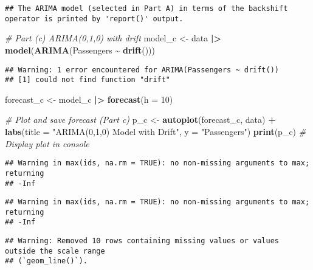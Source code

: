 \documentclass[
]{article}
\newenvironment{Shaded}{\begin{snugshade}}{\end{snugshade}}
\newcommand{\AttributeTok}[1]{\textcolor[rgb]{0.13,0.29,0.53}{#1}}
\newcommand{\CommentTok}[1]{\textcolor[rgb]{0.56,0.35,0.01}{\textit{#1}}}
\newcommand{\DecValTok}[1]{\textcolor[rgb]{0.00,0.00,0.81}{#1}}
\newcommand{\FunctionTok}[1]{\textcolor[rgb]{0.13,0.29,0.53}{\textbf{#1}}}
\newcommand{\NormalTok}[1]{#1}
\newcommand{\OtherTok}[1]{\textcolor[rgb]{0.56,0.35,0.01}{#1}}
\newcommand{\SpecialCharTok}[1]{\textcolor[rgb]{0.81,0.36,0.00}{\textbf{#1}}}
\newcommand{\StringTok}[1]{\textcolor[rgb]{0.31,0.60,0.02}{#1}}
\begin{document}
\begin{verbatim}
## The ARIMA model (selected in Part A) in terms of the backshift operator is printed by 'report()' output.
\end{verbatim}

\begin{Shaded}
\begin{Highlighting}[]
\CommentTok{\# Part (c) ARIMA(0,1,0) with drift}
\NormalTok{model\_c }\OtherTok{\textless{}{-}}\NormalTok{ data }\SpecialCharTok{|\textgreater{}} \FunctionTok{model}\NormalTok{(}\FunctionTok{ARIMA}\NormalTok{(Passengers }\SpecialCharTok{\textasciitilde{}} \FunctionTok{drift}\NormalTok{()))}
\end{Highlighting}
\end{Shaded}

\begin{verbatim}
## Warning: 1 error encountered for ARIMA(Passengers ~ drift())
## [1] could not find function "drift"
\end{verbatim}

\begin{Shaded}
\begin{Highlighting}[]
\NormalTok{forecast\_c }\OtherTok{\textless{}{-}}\NormalTok{ model\_c }\SpecialCharTok{|\textgreater{}} \FunctionTok{forecast}\NormalTok{(}\AttributeTok{h =} \DecValTok{10}\NormalTok{)}

\CommentTok{\# Plot and save forecast (Part c)}
\NormalTok{p\_c }\OtherTok{\textless{}{-}} \FunctionTok{autoplot}\NormalTok{(forecast\_c, data) }\SpecialCharTok{+}
  \FunctionTok{labs}\NormalTok{(}\AttributeTok{title =} \StringTok{"ARIMA(0,1,0) Model with Drift"}\NormalTok{, }\AttributeTok{y =} \StringTok{"Passengers"}\NormalTok{)}
\FunctionTok{print}\NormalTok{(p\_c) }\CommentTok{\# Display plot in console}
\end{Highlighting}
\end{Shaded}

\begin{verbatim}
## Warning in max(ids, na.rm = TRUE): no non-missing arguments to max; returning
## -Inf
\end{verbatim}

\begin{verbatim}
## Warning in max(ids, na.rm = TRUE): no non-missing arguments to max; returning
## -Inf
\end{verbatim}

\begin{verbatim}
## Warning: Removed 10 rows containing missing values or values outside the scale range
## (`geom_line()`).
\end{verbatim}
\end{document}
